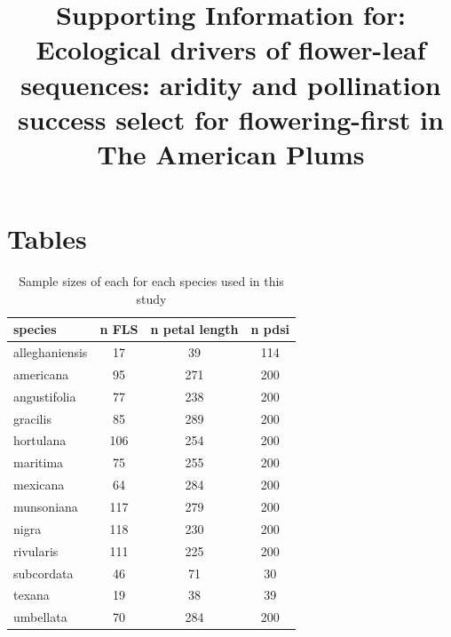 \documentclass{article}[11pt]
\title{Supporting Information for: Ecological drivers of flower-leaf sequences: aridity and pollination success select for flowering-first in The American Plums} %
\date{}
\begin{document}

\maketitle

\section*{Tables}
\begin{table}[ht]
\centering
\begin{tabular}{|lccc|}
  \hline
  species & n FLS & n petal length & n pdsi \\ 
  \hline
 alleghaniensis &  17 &  39 & 114 \\ 
americana &  95 & 271 & 200 \\ 
angustifolia &  77 & 238 & 200 \\ 
 gracilis &  85 & 289 & 200 \\ 
 hortulana & 106 & 254 & 200 \\ 
  maritima &  75 & 255 & 200 \\ 
  mexicana &  64 & 284 & 200 \\ 
  munsoniana & 117 & 279 & 200 \\ 
 nigra & 118 & 230 & 200 \\ 
   rivularis & 111 & 225 & 200 \\ 
   subcordata &  46 &  71 &  30 \\ 
   texana &  19 &  38 &  39 \\ 
  umbellata &  70 & 284 & 200 \\ 
   \hline
\end{tabular}
\caption{Sample sizes of each for each species used in this study}
\label{tab:samps}
\end{table}
\end{document}
